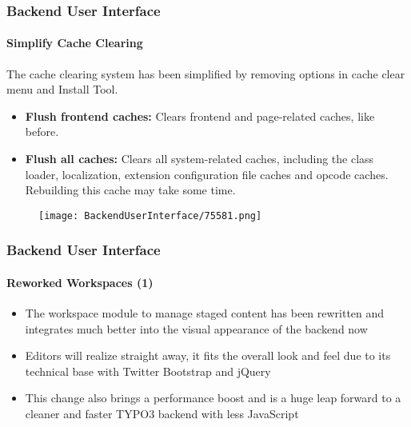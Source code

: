 \begin{frame}[fragile]
	\frametitle{Backend User Interface}
	\framesubtitle{Simplify Cache Clearing}

	The cache clearing system has been simplified by removing options in cache clear menu and
	Install Tool.

	\begin{itemize}

		\item \textbf{Flush frontend caches:}\newline
			\small
				Clears frontend and page-related caches, like before.
			\normalsize

		\item \textbf{Flush all caches:}\newline
			\small
				Clears all system-related caches, including the class loader, localization,
				extension configuration file caches and opcode caches. Rebuilding this cache
				may take some time.
			\normalsize

	\end{itemize}

	\begin{figure}
		\texttt{[image: BackendUserInterface/75581.png]}
	\end{figure}

\end{frame}

\begin{frame}[fragile]
	\frametitle{Backend User Interface}
	\framesubtitle{Reworked Workspaces (1)}

	\begin{itemize}

		\item The workspace module to manage staged content has been rewritten and
			integrates much better into the visual appearance of the backend now

		\item Editors will realize straight away, it fits the overall look and feel
			due to its technical base with Twitter Bootstrap and jQuery

		\item This change also brings a performance boost and is a huge leap forward
			to a cleaner and faster TYPO3 backend with less JavaScript

	\end{itemize}

\end{frame}

